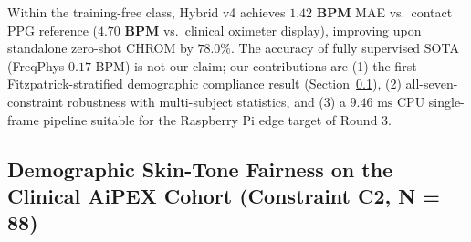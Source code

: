 \documentclass[conference]{IEEEtran}
\begin{document}
\begin{table}[t]
\centering
\caption{Published UBFC-rPPG Intra-Dataset MAE Context (Protocols Differ:
$k$-Fold Supervised vs.\ Training-Free)}
\label{tab:sota}
\end{table}

Within the training-free class, Hybrid v4 achieves $\mathbf{1.42\text{ BPM}}$ MAE vs.\ contact PPG reference ($\mathbf{4.70\text{ BPM}}$ vs.\ clinical oximeter display), improving upon standalone zero-shot CHROM by $78.0\%$. The accuracy of fully supervised
SOTA (FreqPhys $0.17\text{ BPM}$) is not our claim; our contributions are
(1) the first Fitzpatrick-stratified demographic compliance result
(Section~\ref{sec:fairness}), (2) all-seven-constraint robustness with multi-subject
statistics, and (3) a $9.46\text{ ms}$ CPU single-frame pipeline suitable
for the Raspberry Pi edge target of Round 3.

\subsection{Demographic Skin-Tone Fairness on the Clinical AiPEX Cohort (Constraint C2, N = 88)}
\label{sec:fairness}
\end{document}
